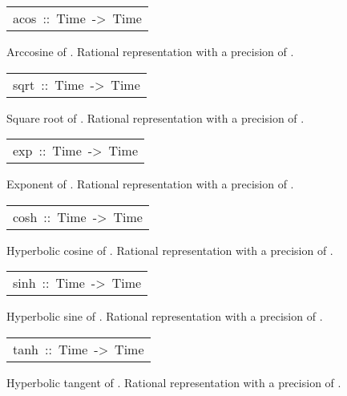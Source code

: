 \begin{haddockdesc}
\item[\begin{tabular}{@{}l}
acos\ ::\ Time\ ->\ Time
\end{tabular}]\haddockbegindoc
Arccosine of . Rational representation with a precision
 of .\par

\end{haddockdesc}
\begin{haddockdesc}
\item[\begin{tabular}{@{}l}
sqrt\ ::\ Time\ ->\ Time
\end{tabular}]\haddockbegindoc
Square root of . Rational representation with a precision
 of .\par

\end{haddockdesc}
\begin{haddockdesc}
\item[\begin{tabular}{@{}l}
exp\ ::\ Time\ ->\ Time
\end{tabular}]\haddockbegindoc
Exponent of . Rational representation with a precision of
 .\par

\end{haddockdesc}
\begin{haddockdesc}
\item[\begin{tabular}{@{}l}
cosh\ ::\ Time\ ->\ Time
\end{tabular}]\haddockbegindoc
Hyperbolic cosine of . Rational representation with a
 precision of .\par

\end{haddockdesc}
\begin{haddockdesc}
\item[\begin{tabular}{@{}l}
sinh\ ::\ Time\ ->\ Time
\end{tabular}]\haddockbegindoc
Hyperbolic sine of . Rational representation with a
 precision of .\par

\end{haddockdesc}
\begin{haddockdesc}
\item[\begin{tabular}{@{}l}
tanh\ ::\ Time\ ->\ Time
\end{tabular}]\haddockbegindoc
Hyperbolic tangent of . Rational representation with a
 precision of .\par

\end{haddockdesc}
